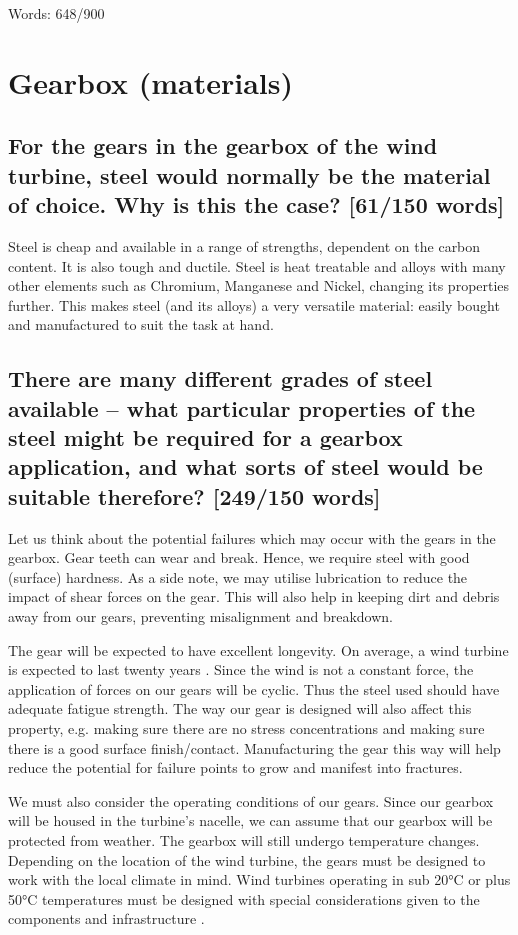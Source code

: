 \documentclass[12pt]{article}
\numberwithin{equation}{section}
\begin{document}
\begin{flushleft}
Words: 648/900
\section{Gearbox (materials)}
\subsection[Why is steel used?]{For the gears in the gearbox of the wind turbine, steel would normally be the material of choice. Why is this the case? [61/150 words]}
Steel is cheap and available in a range of strengths, dependent on the carbon content. It is also tough and ductile. Steel is heat treatable and alloys with many other elements such as Chromium, Manganese and Nickel, changing its properties further. This makes steel (and its alloys) a very versatile material: easily bought and manufactured to suit the task at hand.
\subsection[What steel is suitable?]{There are many different grades of steel available – what particular properties of the steel might be required for a gearbox application, and what sorts of steel would be suitable therefore? [249/150 words]}
Let us think about the potential failures which may occur with the gears in the gearbox. Gear teeth can wear and break. Hence, we require steel with good (surface) hardness. As a side note, we may utilise lubrication to reduce the impact of shear forces on the gear. This will also help in keeping dirt and debris away from our gears, preventing misalignment and breakdown. 

The gear will be expected to have excellent longevity. On average, a wind turbine is expected to last twenty years \citep{windTurbineLifetime}. Since the wind is not a constant force, the application of forces on our gears will be cyclic. Thus the steel used should have adequate fatigue strength. The way our gear is designed will also affect this property, e.g. making sure there are no stress concentrations and making sure there is a good surface finish/contact. Manufacturing the gear this way will help reduce the potential for failure points to grow and manifest into fractures. 

We must also consider the operating conditions of our gears. Since our gearbox will be housed in the turbine's nacelle, we can assume that our gearbox will be protected from weather. The gearbox will still undergo temperature changes. Depending on the location of the wind turbine, the gears must be designed to work with the local climate in mind. Wind turbines operating in sub 20\si{\celsius} or plus 50\si{\celsius} temperatures must be designed with special considerations given to the components and infrastructure \citep{windTurbineOperatingConditions}. 


\end{flushleft}
\end{document}
